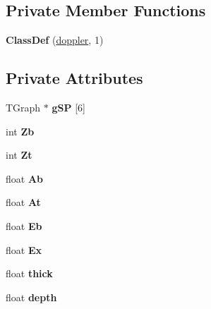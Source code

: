 \subsection*{Private Member Functions}
\begin{DoxyCompactItemize}
\item 
\mbox{\label{classdoppler_ade7546707b0924034fea20592ea8be3f}} 
{\bfseries Class\+Def} (\hyperlink{classdoppler}{doppler}, 1)
\end{DoxyCompactItemize}
\subsection*{Private Attributes}
\begin{DoxyCompactItemize}
\item 
\mbox{\label{classdoppler_a68aa6852863cc61aac4b48232984d9e3}} 
T\+Graph $\ast$ {\bfseries g\+SP} \mbox{[}6\mbox{]}
\item 
\mbox{\label{classdoppler_a9d471fcad9598fd2ade30e33fa975a68}} 
int {\bfseries Zb}
\item 
\mbox{\label{classdoppler_af8a5a56a1df23ebbad07fc02dc769301}} 
int {\bfseries Zt}
\item 
\mbox{\label{classdoppler_a5cade73bdf88628d2249fe132fafa09d}} 
float {\bfseries Ab}
\item 
\mbox{\label{classdoppler_a74c6dbe49c10b46c6a7359d63bb2de70}} 
float {\bfseries At}
\item 
\mbox{\label{classdoppler_a9a878a5ca9fc4137f5947bb92d7425c2}} 
float {\bfseries Eb}
\item 
\mbox{\label{classdoppler_a98c25c360b741e6974ed025c4729a99e}} 
float {\bfseries Ex}
\item 
\mbox{\label{classdoppler_ae033bed03e9914f81466554748fb8f52}} 
float {\bfseries thick}
\item 
\mbox{\label{classdoppler_ac238412e666b74f8e087841d74ba29d9}} 
float {\bfseries depth}
\item 

\end{DoxyCompactItemize}
